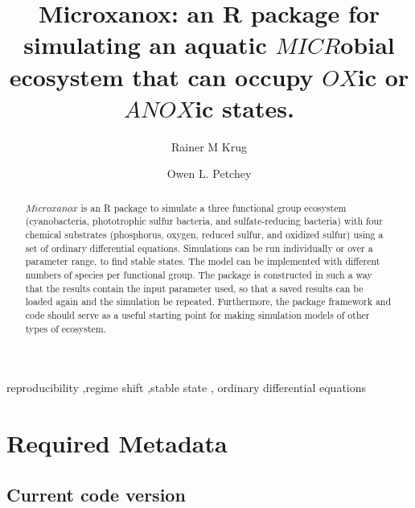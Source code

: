 \documentclass[]{elsarticle} %
\begin{document}
\begin{frontmatter}

  \title{Microxanox: an R package for simulating an aquatic
\(MICR\)obial ecosystem that can occupy \(OX\)ic or \(ANOX\)ic states.}
    \author[University of Zürich]{Rainer M Krug%
  }
    \author[University of Zürich]{Owen L. Petchey}
  
  \begin{abstract}
  \(Microxanox\) is an R package to simulate a three functional group
  ecosystem (cyanobacteria, phototrophic sulfur bacteria, and
  sulfate-reducing bacteria) with four chemical substrates (phosphorus,
  oxygen, reduced sulfur, and oxidized sulfur) using a set of ordinary
  differential equations. Simulations can be run individually or over a
  parameter range, to find stable states. The model can be implemented
  with different numbers of species per functional group. The package is
  constructed in such a way that the results contain the input parameter
  used, so that a saved results can be loaded again and the simulation
  be repeated. Furthermore, the package framework and code should serve
  as a useful starting point for making simulation models of other types
  of ecosystem.
  \end{abstract}
    \begin{keyword}
    reproducibility \sep regime shift \sep stable state \sep 
    ordinary differential equations
  \end{keyword}
  
 \end{frontmatter}

\pagebreak

\hypertarget{required-metadata}{%
\section{Required Metadata}\label{required-metadata}}

\hypertarget{current-code-version}{%
\subsection{Current code version}\label{current-code-version}}
\end{document}
